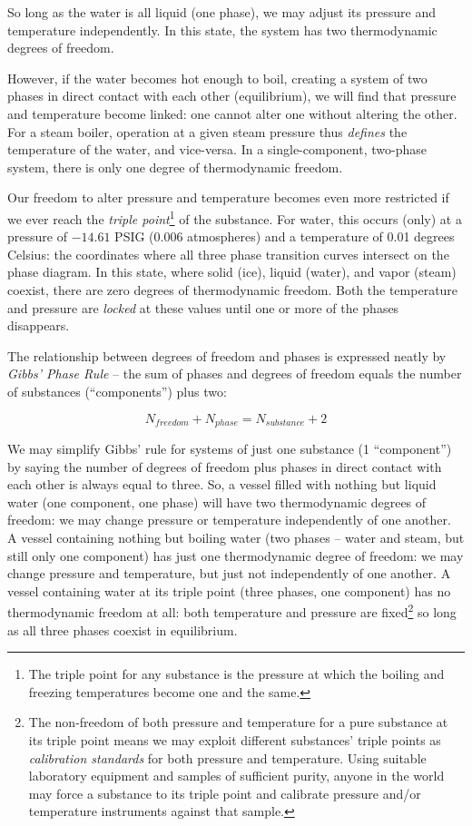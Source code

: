 So long as the water is all liquid (one phase), we may adjust its pressure and temperature independently.  In this state, the system has two thermodynamic degrees of freedom.

However, if the water becomes hot enough to boil, creating a system of two phases in direct contact with each other (equilibrium), we will find that pressure and temperature become linked: one cannot alter one without altering the other.  For a steam boiler, operation at a given steam pressure thus \textit{defines} the temperature of the water, and vice-versa.  In a single-component, two-phase system, there is only one degree of thermodynamic freedom.

Our freedom to alter pressure and temperature becomes even more restricted if we ever reach the \textit{triple point}\footnote{The triple point for any substance is the pressure at which the boiling and freezing temperatures become one and the same.} of the substance.  For water, this occurs (only) at a pressure of $-14.61$ PSIG (0.006 atmospheres) and a temperature of 0.01 degrees Celsius: the coordinates where all three phase transition curves intersect on the phase diagram.  In this state, where solid (ice), liquid (water), and vapor (steam) coexist, there are zero degrees of thermodynamic freedom.  Both the temperature and pressure are \textit{locked} at these values until one or more of the phases disappears.

The relationship between degrees of freedom and phases is expressed neatly by \textit{Gibbs' Phase Rule} -- the sum of phases and degrees of freedom equals the number of substances (``components'') plus two: 

$$N_{freedom} + N_{phase} = N_{substance} + 2$$

We may simplify Gibbs' rule for systems of just one substance (1 ``component'') by saying the number of degrees of freedom plus phases in direct contact with each other is always equal to three.  So, a vessel filled with nothing but liquid water (one component, one phase) will have two thermodynamic degrees of freedom: we may change pressure or temperature independently of one another.  A vessel containing nothing but boiling water (two phases -- water and steam, but still only one component) has just one thermodynamic degree of freedom: we may change pressure and temperature, but just not independently of one another.  A vessel containing water at its triple point (three phases, one component) has no thermodynamic freedom at all: both temperature and pressure are fixed\footnote{The non-freedom of both pressure and temperature for a pure substance at its triple point means we may exploit different substances' triple points as \textit{calibration standards} for both pressure and temperature.  Using suitable laboratory equipment and samples of sufficient purity, anyone in the world may force a substance to its triple point and calibrate pressure and/or temperature instruments against that sample.} so long as all three phases coexist in equilibrium.











